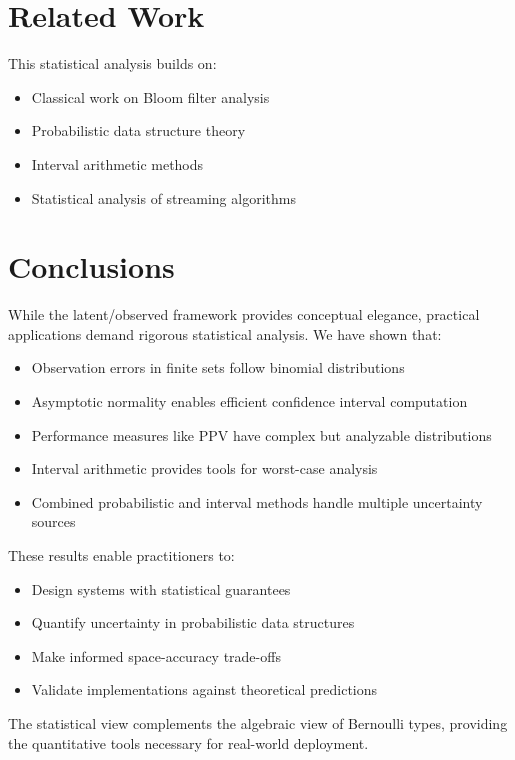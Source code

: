 \documentclass[11pt,final,hidelinks]{article}
\begin{document}
\section{Related Work}

This statistical analysis builds on:
\begin{itemize}
    \item Classical work on Bloom filter analysis \cite{bloom1970,mitzenmacher2002}
    \item Probabilistic data structure theory \cite{broder2004}
    \item Interval arithmetic methods \cite{moore1966}
    \item Statistical analysis of streaming algorithms \cite{cormode2005}
\end{itemize}

\section{Conclusions}

While the latent/observed framework provides conceptual elegance, practical applications demand rigorous statistical analysis. We have shown that:

\begin{itemize}
    \item Observation errors in finite sets follow binomial distributions
    \item Asymptotic normality enables efficient confidence interval computation
    \item Performance measures like PPV have complex but analyzable distributions
    \item Interval arithmetic provides tools for worst-case analysis
    \item Combined probabilistic and interval methods handle multiple uncertainty sources
\end{itemize}

These results enable practitioners to:
\begin{itemize}
    \item Design systems with statistical guarantees
    \item Quantify uncertainty in probabilistic data structures
    \item Make informed space-accuracy trade-offs
    \item Validate implementations against theoretical predictions
\end{itemize}

The statistical view complements the algebraic view of Bernoulli types, providing the quantitative tools necessary for real-world deployment.


\end{document}
